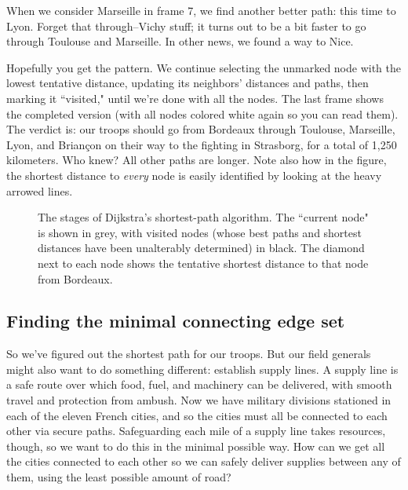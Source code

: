 When we consider Marseille in frame 7, we find another better path: this
time to Lyon. Forget that through--Vichy stuff; it turns out to be a bit
faster to go through Toulouse and Marseille. In other news, we found a way
to Nice.

Hopefully you get the pattern. We continue selecting the unmarked node with
the lowest tentative distance, updating its neighbors' distances and paths,
then marking it ``visited," until we're done with all the nodes. The last
frame shows the completed version (with all nodes colored white again so
you can read them). The verdict is: our troops should go from Bordeaux
through Toulouse, Marseille, Lyon, and Brian\c{c}on on their way to the
fighting in Strasborg, for a total of 1,250 kilometers. Who knew? All other
paths are longer. Note also how in the figure, the shortest distance to
\textit{every} node is easily identified by looking at the heavy arrowed
lines.


\begin{figure}[ht]
\centering
\begin{custommargins}{-2.4cm}{-2.8cm}

\caption{The stages of Dijkstra's shortest-path algorithm. The ``current
node" is shown in grey, with visited nodes (whose best paths and shortest
distances have been unalterably determined) in black. The diamond next to
each node shows the tentative shortest distance to that node from
Bordeaux.}
\label{fig:dijkstra}
\end{custommargins}
\end{figure}

\subsection{Finding the minimal connecting edge set}

So we've figured out the shortest path for our troops. But our field
generals might also want to do something different: establish supply lines.
A supply line is a safe route over which food, fuel, and machinery can be
delivered, with smooth travel and protection from ambush. Now we have
military divisions stationed in each of the eleven French cities, and so
the cities must all be connected to each other via secure paths.
Safeguarding each mile of a supply line takes resources, though, so we want
to do this in the minimal possible way. How can we get all the cities
connected to each other so we can safely deliver supplies between any of
them, using the least possible amount of road?

